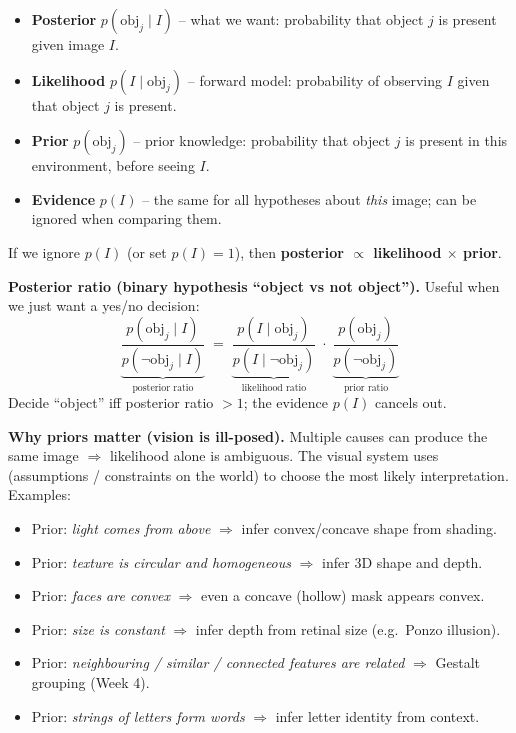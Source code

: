 \begin{defbox}
\begin{itemize}
  \item \textbf{Posterior} $p(\text{obj}_j \mid I)$ -- what we want: probability that object $j$ is present given image $I$.
  \item \textbf{Likelihood} $p(I \mid \text{obj}_j)$ -- forward model: probability of observing $I$ given that object $j$ is present.
  \item \textbf{Prior} $p(\text{obj}_j)$ -- prior knowledge: probability that object $j$ is present in this environment, before seeing $I$.
  \item \textbf{Evidence} $p(I)$ -- the same for all hypotheses about \emph{this} image; can be ignored when comparing them.
\end{itemize}
\end{defbox}

If we ignore $p(I)$ (or set $p(I)=1$), then \quad \textbf{posterior $\propto$ likelihood $\times$ prior}.

\separator

\textbf{Posterior ratio (binary hypothesis ``object vs not object'').} Useful when we just want a yes/no decision:
\[
\underbrace{\frac{p(\text{obj}_j \mid I)}{p(\neg\text{obj}_j \mid I)}}_{\text{posterior ratio}}
\;=\;
\underbrace{\frac{p(I \mid \text{obj}_j)}{p(I \mid \neg\text{obj}_j)}}_{\text{likelihood ratio}}
\;\cdot\;
\underbrace{\frac{p(\text{obj}_j)}{p(\neg\text{obj}_j)}}_{\text{prior ratio}}
\]
Decide ``object'' iff posterior ratio $> 1$; the evidence $p(I)$ cancels out.

\separator

\textbf{Why priors matter (vision is ill-posed).}
Multiple causes can produce the same image $\Rightarrow$ likelihood alone is ambiguous. The visual system uses  (assumptions / constraints on the world) to choose the most likely interpretation. Examples:
\begin{itemize}
  \item Prior: \emph{light comes from above} $\Rightarrow$ infer convex/concave shape from shading.
  \item Prior: \emph{texture is circular and homogeneous} $\Rightarrow$ infer 3D shape and depth.
  \item Prior: \emph{faces are convex} $\Rightarrow$ even a concave (hollow) mask appears convex.
  \item Prior: \emph{size is constant} $\Rightarrow$ infer depth from retinal size (e.g.\ Ponzo illusion).
  \item Prior: \emph{neighbouring / similar / connected features are related} $\Rightarrow$ Gestalt grouping (Week 4).
  \item Prior: \emph{strings of letters form words} $\Rightarrow$ infer letter identity from context.
\end{itemize}

